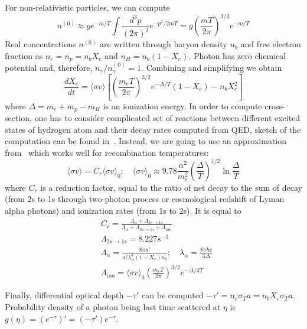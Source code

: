 \documentclass[12pt]{extarticle}
\numberwithin{problem}{section}
\numberwithin{theorem}{section}
\begin{document}
	For non-relativistic particles, we can compute
	\begin{equation}
		n^{(0)} \approx ge^{-m/T}\int\frac{d^3p}{(2\pi)^3}e^{-p^2/2mT} = g\left(\frac{mT}{2\pi}\right)^{3/2}e^{-m/T}
	\end{equation}
	Real concentrations $n^{(0)}$ are written through baryon density $n_b$ and free electron fraction as $n_e = n_p = n_b X_e$ and $n_H = n_b (1 - X_e)$. Photon has zero chemical potential and, therefore, $n_\gamma/n_\gamma^{(0)} = 1$. Combining and simplifying we obtain
	\begin{equation}
		\frac{dX_e}{dt} = \langle\sigma v\rangle\left[\left(\frac{m_eT}{2\pi}\right)^{3/2}e^{-\Delta/T}(1 - X_e) - n_b X_e^2\right]
	\end{equation}
	where $\Delta = m_e + m_p - m_H$ is an ionization energy. In order to compute cross-section, one has to consider complicated set of reactions between different excited states of hydrogen atom and their decay rates computed from QED, sketch of the computation can be found in~\cite{peebles:1993}. Instead, we are going to use an approximation from~\cite{ma:1995} which works well for recombination temperatures:
	\begin{equation}
		\langle\sigma v\rangle = C_r\langle\sigma v\rangle_0;\quad \langle\sigma v\rangle_0\approx9.78 \frac{\alpha^2}{m_e^2}\left(\frac{\Delta}{T}\right)^{1/2}\ln\frac{\Delta}{T}
	\end{equation}
	where $C_r$ is a reduction factor, equal to the ratio of net decay to the sum of decay (from 2s to 1s through two-photon process or cosmological redshift of Lyman alpha photons) and ionization rates (from 1s to 2s). It is equal to
	\begin{align}
		& C_r = \frac{\Lambda_\alpha + \Lambda_{2s\to1s}}{\Lambda_\alpha + 
		\Lambda_{2s\to1s} + \Lambda_{ion}} \\
		& \Lambda_{2s\to1s} = 8.227 s^{-1} \\
		& \Lambda_\alpha = \frac{8\pi a'}{a^2\lambda_\alpha^3(1-X_e)n_b};\quad \lambda_\alpha = \frac{8\pi\hbar c}{3\Delta} \\ 
		& \Lambda_{ion} = \langle\sigma v\rangle_0 \left(\frac{m_eT}{2\pi}\right)^{3/2}e^{-\Delta/4T}
	\end{align}

	Finally, differential optical depth $-\tau'$ can be computed $-\tau' = n_e\sigma_Ta = n_bX_e\sigma_Ta$. Probability density of a photon being last time scattered at $\eta$ is $g(\eta) = (e^{-\tau})' = (-\tau')e^{-\tau}$. 
	
\end{document}
